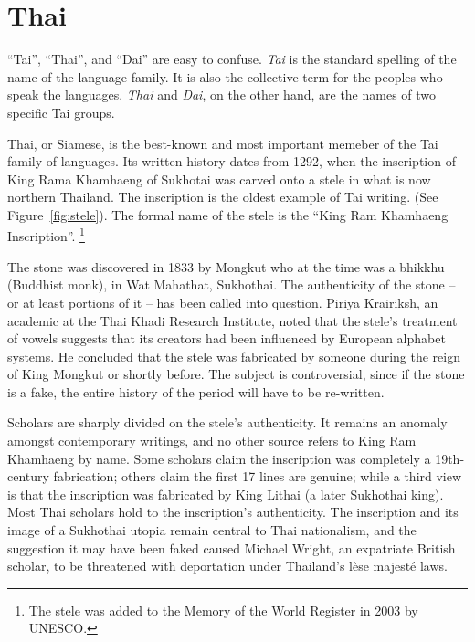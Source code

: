 \def\thaitext#1{{\thai#1}}

\section{Thai}
\label{s:thai}

``Tai'', ``Thai'', and ``Dai'' are easy to confuse. \textit{Tai} is the standard spelling of the name of the language family. It is also the collective term for the peoples who speak the languages. \textit{Thai} and \textit{Dai}, on the other hand, are the names of two specific Tai groups.

Thai, or Siamese, is the best-known and most important memeber of the Tai family of languages. Its written history dates from 1292, when the inscription of King Rama Khamhaeng of Sukhotai was carved onto a stele in what is now northern Thailand. The inscription is the oldest example of Tai writing. (See Figure~\ref{fig:stele}). The formal name of the stele is the ``King Ram Khamhaeng Inscription''. \footnote{The stele  was added to the Memory of the World Register in 2003 by \textsc{UNESCO}.}

The stone was discovered in 1833 by Mongkut who at the time was a bhikkhu (Buddhist monk), in Wat Mahathat, Sukhothai. The authenticity of the stone – or at least portions of it – has been called into question. Piriya Krairiksh, an academic at the Thai Khadi Research Institute, noted that the stele's treatment of vowels suggests that its creators had been influenced by European alphabet systems. He concluded that the stele was fabricated by someone during the reign of King Mongkut or shortly before. The subject is controversial, since if the stone is a fake, the entire history of the period will have to be re-written.

Scholars are sharply divided on the stele's authenticity. It remains an anomaly amongst contemporary writings, and no other source refers to King Ram Khamhaeng by name. Some scholars claim the inscription was completely a 19th-century fabrication; others claim the first 17 lines are genuine; while a third view is that the inscription was fabricated by King Lithai (a later Sukhothai king). Most Thai scholars hold to the inscription's authenticity. The inscription and its image of a Sukhothai utopia remain central to Thai nationalism, and the suggestion it may have been faked caused Michael Wright, an expatriate British scholar, to be threatened with deportation under Thailand's lèse majesté laws. 

